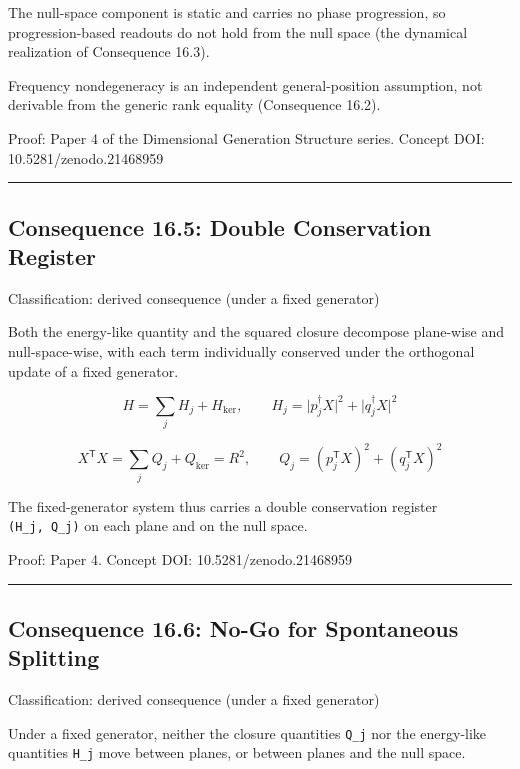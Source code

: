 \documentclass[
  a4paper,
]{article}
\begin{document}
The null-space component is static and carries no phase progression, so
progression-based readouts do not hold from the null space (the
dynamical realization of Consequence 16.3).

Frequency nondegeneracy is an independent general-position assumption,
not derivable from the generic rank equality (Consequence 16.2).

Proof: Paper 4 of the Dimensional Generation Structure series. Concept
DOI: 10.5281/zenodo.21468959

\begin{center}\rule{0.5\linewidth}{0.5pt}\end{center}

\subsection{Consequence 16.5: Double Conservation
Register}\label{consequence-16.5-double-conservation-register}

Classification: derived consequence (under a fixed generator)

Both the energy-like quantity and the squared closure decompose
plane-wise and null-space-wise, with each term individually conserved
under the orthogonal update of a fixed generator.

\[
H=\sum_{j}H_j+H_{\ker},
\qquad
H_j=\lvert p_j^\dagger X\rvert^2+\lvert q_j^\dagger X\rvert^2
\]

\[
X^{\mathsf T}X=\sum_{j}Q_j+Q_{\ker}=R^2,
\qquad
Q_j=(p_j^{\mathsf T}X)^2+(q_j^{\mathsf T}X)^2
\]

The fixed-generator system thus carries a double conservation register
\texttt{(H\_j,\ Q\_j)} on each plane and on the null space.

Proof: Paper 4. Concept DOI: 10.5281/zenodo.21468959

\begin{center}\rule{0.5\linewidth}{0.5pt}\end{center}

\subsection{Consequence 16.6: No-Go for Spontaneous
Splitting}\label{consequence-16.6-no-go-for-spontaneous-splitting}

Classification: derived consequence (under a fixed generator)

Under a fixed generator, neither the closure quantities \texttt{Q\_j}
nor the energy-like quantities \texttt{H\_j} move between planes, or
between planes and the null space.
\end{document}
